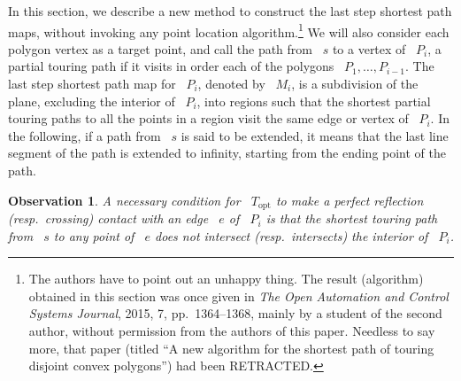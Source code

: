 \documentclass[11pt]{article}
\newtheorem{observation}{Observation}
\begin{document}
In this section, we describe a new method to construct the last step shortest path maps, without invoking any point location algorithm.\footnote{The authors have to point out an unhappy thing. The result (algorithm) obtained in this section was once given in \emph{The Open Automation and Control Systems Journal}, 2015, 7, pp.\ 1364--1368, mainly by a student of the second author, without permission from the authors of this paper. Needless to say more, that paper (titled ``A new algorithm for the shortest path of touring disjoint convex polygons'') had been RETRACTED.}
We will also consider each polygon vertex as a target point, and call the path from ~\(s\) to a vertex of ~\(P_i\), a partial touring path if it visits in order each of the polygons ~\(P_1, \ldots, P_{i-1}\).
The last step shortest path map for ~\(P_i\), denoted by ~\(M_i\), is a subdivision of the plane, excluding the interior of ~\(P_i\), into regions such that the shortest partial touring paths to all the points in a region visit the same edge or vertex of ~\(P_i\).
In the following, if a path from ~\(s\) is said to be extended, it means that the last line segment of the path is extended to infinity, starting from the ending point of the path.

\begin{observation}
\label{obs:necessary}
A necessary condition for ~\(T_{\mathrm{opt}}\) to make a perfect reflection (resp.\ crossing) contact with an edge ~\(e\) of ~\(P_i\) is that the shortest touring path from ~\(s\) to any point of ~\(e\) does not intersect (resp.\ intersects) the interior of ~\(P_i\).
\end{observation}
\end{document}
